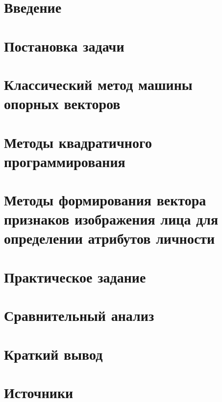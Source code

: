 \documentclass[main.tex]{subfiles}
\begin{document}
\section{Введение}

\section{Постановка задачи}



\section{Классический метод машины опорных векторов}

\section{Методы квадратичного программирования}




\section{Методы формирования вектора признаков изображения лица для определении атрибутов личности}

\section{Практическое задание}

\section{Сравнительный анализ}


\section{Краткий вывод}

\newpage
\section{Источники}

\end{document}
